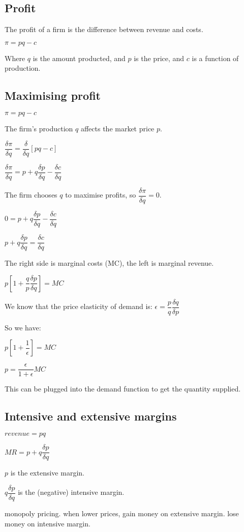 
\subsection{Profit}

The profit of a firm is the difference between revenue and costs.

\(\pi = pq-c\)

Where \(q\) is the amount producted, and \(p\) is the price, and \(c\) is a function of production.

\subsection{Maximising profit}

\(\pi = pq-c\)

The firm's production \(q\) affects the market price \(p\).

\(\dfrac{\delta \pi }{\delta q}= \dfrac{\delta }{\delta q} [pq-c]\)

\(\dfrac{\delta \pi }{\delta q}= p+q\dfrac{\delta p}{\delta q}-\dfrac{\delta c}{\delta q}\)

The firm chooses \(q\) to maximise profits, so \(\dfrac{\delta \pi }{\delta q} = 0\).

\(0 = p+q\dfrac{\delta p}{\delta q}-\dfrac{\delta c}{\delta q}\)

\(p+q\dfrac{\delta p}{\delta q}=\dfrac{\delta c}{\delta q}\)

The right side is marginal costs (MC), the left is marginal revenue.

\(p[1+\dfrac{q}{p}\dfrac{\delta p}{\delta q}]=MC\)

We know that the price elasticity of demand is: \(\epsilon = \dfrac{p}{q}\dfrac{\delta q}{\delta p}\)

So we have:

\(p[1+\dfrac{1 }{\epsilon }]=MC\)

\(p=\dfrac{\epsilon }{1+\epsilon }MC\)

This can be plugged into the demand function to get the quantity supplied.

\subsection{Intensive and extensive margins}

\(revenue = pq\)

\(MR=p +q\dfrac{\delta p}{\delta q}\)

\(p\) is the extensive margin.

\(q\dfrac{\delta p}{\delta q}\) is the (negative) intensive margin.

monopoly pricing. when lower prices, gain money on extensive margin. lose money on intensive margin.

